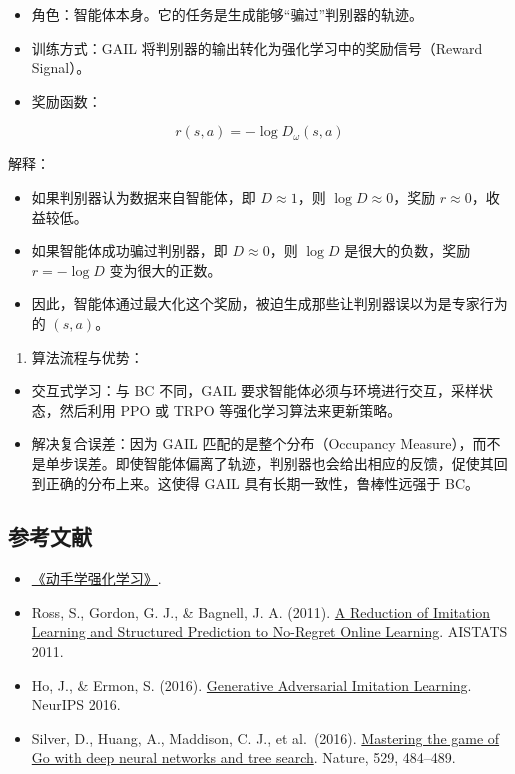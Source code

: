 \begin{itemize}
\tightlist
\item
  角色：智能体本身。它的任务是生成能够``骗过''判别器的轨迹。
\item
  训练方式：GAIL 将判别器的输出转化为强化学习中的奖励信号（Reward Signal）。
\item
  奖励函数：
\end{itemize}

\[
r(s,a)
=
-
\log D_\omega(s,a)
\]

解释：

\begin{itemize}
\tightlist
\item
  如果判别器认为数据来自智能体，即 \(D\approx 1\)，则 \(\log D\approx 0\)，奖励 \(r\approx 0\)，收益较低。
\item
  如果智能体成功骗过判别器，即 \(D\approx 0\)，则 \(\log D\) 是很大的负数，奖励 \(r=-\log D\) 变为很大的正数。
\item
  因此，智能体通过最大化这个奖励，被迫生成那些让判别器误以为是专家行为的 \((s,a)\)。
\end{itemize}

\begin{enumerate}
\def\labelenumi{\arabic{enumi}.}
\setcounter{enumi}{2}
\tightlist
\item
  算法流程与优势：
\end{enumerate}

\begin{itemize}
\tightlist
\item
  交互式学习：与 BC 不同，GAIL 要求智能体必须与环境进行交互，采样状态，然后利用 PPO 或 TRPO 等强化学习算法来更新策略。
\item
  解决复合误差：因为 GAIL 匹配的是整个分布（Occupancy Measure），而不是单步误差。即使智能体偏离了轨迹，判别器也会给出相应的反馈，促使其回到正确的分布上来。这使得 GAIL 具有长期一致性，鲁棒性远强于 BC。
\end{itemize}

\hypertarget{ux53c2ux8003ux6587ux732e-62}{%
\subsection{参考文献}\label{ux53c2ux8003ux6587ux732e-62}}

\vspace{0.25em}
\begin{itemize}
\tightlist
\item
  \href{https://hrl.boyuai.com/}{《动手学强化学习》}.
\item
  Ross, S., Gordon, G. J., \& Bagnell, J. A. (2011). \href{https://proceedings.mlr.press/v15/ross11a.html}{A Reduction of Imitation Learning and Structured Prediction to No-Regret Online Learning}. AISTATS 2011.
\item
  Ho, J., \& Ermon, S. (2016). \href{https://arxiv.org/abs/1606.03476}{Generative Adversarial Imitation Learning}. NeurIPS 2016.
\item
  Silver, D., Huang, A., Maddison, C. J., et al.~(2016). \href{https://doi.org/10.1038/nature16961}{Mastering the game of Go with deep neural networks and tree search}. Nature, 529, 484--489.
\end{itemize}

